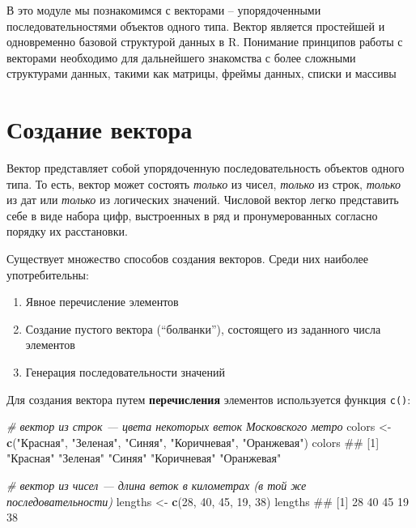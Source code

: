 \documentclass[]{book}
\newenvironment{Shaded}{\begin{snugshade}}{\end{snugshade}}
\newcommand{\KeywordTok}[1]{\textcolor[rgb]{0.13,0.29,0.53}{\textbf{#1}}}
\newcommand{\DecValTok}[1]{\textcolor[rgb]{0.00,0.00,0.81}{#1}}
\newcommand{\StringTok}[1]{\textcolor[rgb]{0.31,0.60,0.02}{#1}}
\newcommand{\CommentTok}[1]{\textcolor[rgb]{0.56,0.35,0.01}{\textit{#1}}}
\newcommand{\NormalTok}[1]{#1}
\providecommand{\tightlist}{%
  \setlength{\itemsep}{0pt}\setlength{\parskip}{0pt}}
\begin{document}
В это модуле мы познакомимся с векторами -- упорядоченными
последовательностями объектов одного типа. Вектор является простейшей и
одновременно базовой структурой данных в R. Понимание принципов работы с
векторами необходимо для дальнейшего знакомства с более сложными
структурами данных, такими как матрицы, фреймы данных, списки и массивы

\section{Создание вектора}\label{vector_creation}

Вектор представляет собой упорядоченную последовательность объектов
одного типа. То есть, вектор может состоять \emph{только} из чисел,
\emph{только} из строк, \emph{только} из дат или \emph{только} из
логических значений. Числовой вектор легко представить себе в виде
набора цифр, выстроенных в ряд и пронумерованных согласно порядку их
расстановки.

Существует множество способов создания векторов. Среди них наиболее
употребительны:

\begin{enumerate}
\def\labelenumi{\arabic{enumi}.}
\tightlist
\item
  Явное перечисление элементов
\item
  Создание пустого вектора (``болванки''), состоящего из заданного числа
  элементов
\item
  Генерация последовательности значений
\end{enumerate}

Для создания вектора путем \textbf{перечисления} элементов используется
функция \texttt{c()}:

\begin{Shaded}
\begin{Highlighting}[]
\CommentTok{# вектор из строк — цвета некоторых веток Московского метро}
\NormalTok{colors <-}\StringTok{ }\KeywordTok{c}\NormalTok{(}\StringTok{"Красная"}\NormalTok{, }\StringTok{"Зеленая"}\NormalTok{, }\StringTok{"Синяя"}\NormalTok{, }\StringTok{"Коричневая"}\NormalTok{, }\StringTok{"Оранжевая"}\NormalTok{)}
\NormalTok{colors}
\NormalTok{## [1] "Красная"    "Зеленая"    "Синяя"      "Коричневая" "Оранжевая"}
\end{Highlighting}
\end{Shaded}

\begin{Shaded}
\begin{Highlighting}[]
\CommentTok{# вектор из чисел — длина веток в километрах (в той же последовательности)}
\NormalTok{lengths <-}\StringTok{ }\KeywordTok{c}\NormalTok{(}\DecValTok{28}\NormalTok{, }\DecValTok{40}\NormalTok{, }\DecValTok{45}\NormalTok{, }\DecValTok{19}\NormalTok{, }\DecValTok{38}\NormalTok{)}
\NormalTok{lengths}
\NormalTok{## [1] 28 40 45 19 38}
\end{Highlighting}
\end{Shaded}
\end{document}
